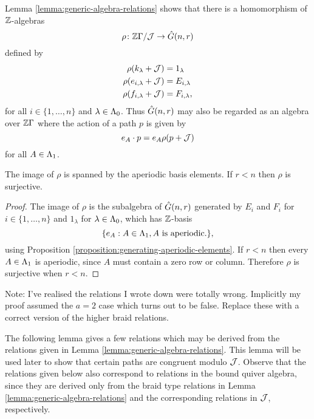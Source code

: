\documentclass[a4paper, 11pt]{report}
\begin{document}
Lemma \ref{lemma:generic-algebra-relations} shows that there is a homomorphism of $\mathbb{Z}$-algebras
\begin{equation*}
\rho\colon\mathbb{Z}\Gamma/{\mathcal{J}}\to\hat{G}(n,r)
\end{equation*}
defined by
\begin{align*}
\rho(k_\lambda +\mathcal{J}) &= 1_\lambda\\
\rho(e_{i,\lambda} +\mathcal{J}) &= E_{i,\lambda}\\
\rho(f_{i,\lambda} +\mathcal{J}) &= F_{i,\lambda},
\end{align*}
for all $i\in\{1,\ldots,n\}$ and $\lambda\in\Lambda_0{}$. Thus $\hat{G}(n,r)$ may also be regarded as an algebra over $\mathbb{Z}\Gamma$ where the action of a path $p$ is given by
\begin{equation*}
e_A\cdot p = e_A\rho(p+\mathcal{J})
\end{equation*}
for all $A\in\Lambda_1{}$.

\begin{proposition}\label{proposition:image-of-quiver-algebra-generic}
The image of $\rho$ is spanned by the aperiodic basis elements. If $r<n$ then $\rho$ is surjective.
\end{proposition}

\begin{proof}
The image of $\rho$ is the subalgebra of $\hat{G}(n,r)$ generated by $E_i$ and $F_i$ for $i\in\{1,\ldots,n\}$ and $1_\lambda$ for $\lambda\in\Lambda_0{}$, which has $\mathbb{Z}$-basis
\begin{equation*}
\{e_A:A\in\Lambda_1{}, A\text{ is aperiodic.}\},
\end{equation*}
using Proposition \ref{proposition:generating-aperiodic-elements}. If $r<n$ then every $A\in\Lambda_1{}$ is aperiodic, since $A$ must contain a zero row or column. Therefore $\rho$ is surjective when $r<n$.
\end{proof}

{\color{red}
Note: I've realised the relations I wrote down were totally wrong. Implicitly my proof assumed the $a=2$ case which turns out to be false. Replace these with a correct version of the higher braid relations.

The following lemma gives a few relations which may be derived from the relations given in Lemma \ref{lemma:generic-algebra-relations}. This lemma will be used later to show that certain paths are congruent modulo $\mathcal{J}$. Observe that the relations given below also correspond to relations in the bound quiver algebra, since they are derived only from the braid type relations in Lemma \ref{lemma:generic-algebra-relations} and the corresponding relations in $\mathcal{J}$, respectively.}
\end{document}
